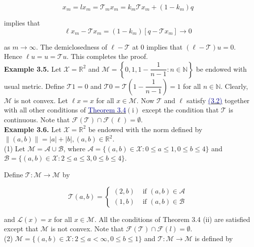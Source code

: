 \documentclass[12pt,a4paper,two side]{article}
\begin{document}
$$
x_m=l x_m=\mathcal{T}_m x_m=k_m \mathcal{T} x_m+\left(1-k_m\right) q
$$

implies that\\

$$
\ell x_m-\mathcal{T} x_m=\left(1-k_m\right)\left[q-\mathcal{T} x_m\right] \rightarrow 0
$$

as $m \rightarrow \infty$. The demiclosedness of $\ell-\mathcal{T}$ at 0 implies that $(\ell-\mathcal{T}) u=0$. Hence $\ell u=u=\mathcal{T} u$. This completes the proof.\\

\textbf{Example 3.5.} Let $\mathcal{X}=\mathbb{R}^2$ and $\mathcal{M}=\left\{0,1,1-\dfrac{1}{n-1}: n \in \mathbb{N}\right\}$ be endowed with usual metric. Define $\mathcal{T} 1=0$ and $\mathcal{T} 0=\mathcal{T}\left(1-\dfrac{1}{n-1}\right)=1$ for all $n \in \mathbb{N}$. Clearly, $\mathcal{M}$ is not convex. Let $\ell x=x$ for all $x \in \mathcal{M}$. Now $\mathcal{T}$ and $\ell$ satisfy \hyperlink{dau3.2}{\textcolor{Darkblue}{(3.2)}} together with all other conditions of \hyperlink{muc3.4}{\textcolor{Darkblue}{Theorem 3.4}}$(\mathrm{i})$ except the condition that $\mathcal{T}$ is continuous. Note that $\mathcal{F}(\mathcal{T}) \cap \mathcal{F}(\ell)=\emptyset$.\\

\textbf{Example 3.6.} Let $\mathcal{X}=\mathbb{R}^2$ be endowed with the norm defined by $\|(a, b)\|=|a|+|b|,(a, b) \in \mathbb{R}^2$.\\
(1) Let $\mathcal{M}=\mathcal{A} \cup \mathscr{B}$, where $\mathcal{A}=\{(a, b) \in \mathcal{X}: 0 \leq a \leq 1,0 \leq b \leq 4\}$ and $\mathscr{B}=\{(a, b) \in \mathcal{X}: 2 \leq a \leq 3,0 \leq b \leq 4\}$.

Define $\mathcal{T}: \mathcal{M} \rightarrow \mathcal{M}$ by

$$
\mathcal{T}(a, b)= \begin{cases}(2, b) & \text { if }(a, b) \in \mathscr{A} \\ (1, b) & \text { if }(a, b) \in \mathscr{B}\end{cases}
$$


and $\mathcal{L}(x)=x$ for all $x \in \mathcal{M}$. All the conditions of Theorem 3.4 (ii) are satisfied except that $\mathcal{M}$ is not convex. Note that $\mathcal{F}(\mathcal{T}) \cap \mathcal{F}(l)=\emptyset$.\\

(2) $\mathcal{M}=\{(a, b) \in \mathcal{X}: 2 \leq a<\infty, 0 \leq b \leq 1\}$ and $\mathcal{T}: \mathcal{M} \rightarrow \mathcal{M}$ is defined by
\end{document}
